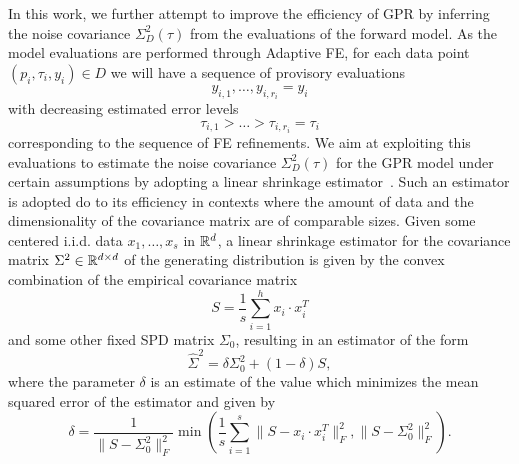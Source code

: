 In this work, we further attempt to improve the efficiency of GPR by inferring the noise covariance $\Sigma^2_D(\tau)$ from the evaluations of the forward model.\newline
As the model evaluations are performed through Adaptive FE, for each data point $(p_i, \tau_i, y_i) \in D$ we will have a sequence of provisory evaluations 
\begin{equation}\label{eq:eval-seq}
     y_{i,1}, \dots, y_{i,r_i} = y_i
\end{equation} 
    with decreasing estimated error levels 
\begin{equation} \label{eq:tol-seq}
        \tau_{i,1} > \dots > \tau_{i,r_i} = \tau_i
\end{equation}
 corresponding to the sequence of FE refinements.
We aim at exploiting this evaluations to estimate the noise covariance $\Sigma^2_D(\tau)$ for the GPR model under certain assumptions by adopting a linear shrinkage estimator~\cite{LedoitWolf2004b}. 
Such an estimator is adopted do to its efficiency in contexts where the amount of data and the dimensionality of the covariance matrix are of comparable sizes. \newline
Given some centered i.i.d. data $x_1,\dots, x_s$ in $\mathbb{R}^d$, a linear shrinkage estimator for the covariance matrix $\Sigma^2 \in \mathbb{R}^{d\times d}$ of the generating distribution is given by the convex combination of the empirical covariance matrix \[
S = \frac{1}{s} \sum_{i=1}^h x_i \cdot x_i^T
\] 
and some other fixed SPD matrix $\Sigma_0$, resulting in an estimator of the form
\begin{equation}\label{eq:shrinkage-estimator-gen}
    \hat \Sigma^2 = \delta \Sigma^2_0 + (1-\delta) S,
\end{equation}
where the parameter $\delta$ is an estimate of the value which minimizes the mean squared error of the estimator and given by 
\begin{equation} \label{eq:shrinkage-delta}
    \delta = \frac{1}{\big \|S - \Sigma^2_0 \big \|_F^2} \min \left( \frac{1}{s} \sum_{i=1}^{s} \big \|S - x_i \cdot x_i^T\big \|_F^2, \big \|S - \Sigma^2_0 \big\|_F^2 \right).
\end{equation}\medbreak

